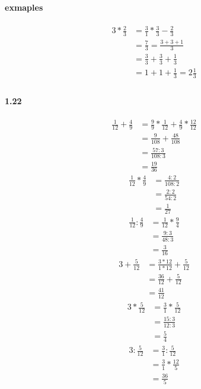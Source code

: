 \documentclass{article}
\begin{document}
\paragraph{exmaples}
\begin{align*}
  3 * \frac{2}{3} &= \frac{3}{1} * \frac{3}{3} - \frac{2}{3} \\
  &= \frac{7}{3} = \frac{3 + 3 + 1}{3} \\
  &= \frac{3}{3} + \frac{3}{3} + \frac{1}{3} \\
  &= 1 + 1 + \frac{1}{3} = 2\frac{1}{3} \\
\end{align*}

\paragraph{1.22}
\begin{align*}
  \frac{1}{12} + \frac{4}{9} &= \frac{9}{9} * \frac{1}{12} + \frac{4}{9} * \frac{12}{12} \\
  &= \frac{9}{108} + \frac{48}{108} \\
  &= \frac{57:3}{108:3} \\
  &= \frac{19}{36}
\end{align*}
\begin{align*}
  \frac{1}{12} * \frac{4}{9} &= \frac{4:2}{108:2} \\
  &= \frac{2:2}{54:2} \\
  &= \frac{1}{27}
\end{align*}
\begin{align*}
  \frac{1}{12} : \frac{4}{9} &= \frac{1}{12} * \frac{9}{4} \\
  &= \frac{9:3}{48:3} \\
  &= \frac{3}{16}
\end{align*}
\begin{align*}
  3 + \frac{5}{12} &= \frac{3 * 12}{1 * 12} + \frac{5}{12} \\
  &= \frac{36}{12} + \frac{5}{12} \\
  &= \frac{41}{12}
\end{align*}
\begin{align*}
  3 * \frac{5}{12} &= \frac{3}{1} * \frac{5}{12} \\
  &= \frac{15:3}{12:3} \\
  &= \frac{5}{4}
\end{align*}
\begin{align*}
  3 : \frac{5}{12} &= \frac{3}{1} : \frac{5}{12} \\
  &= \frac{3}{1} * \frac{12}{5} \\
  &= \frac{36}{5}
\end{align*}
\end{document}
